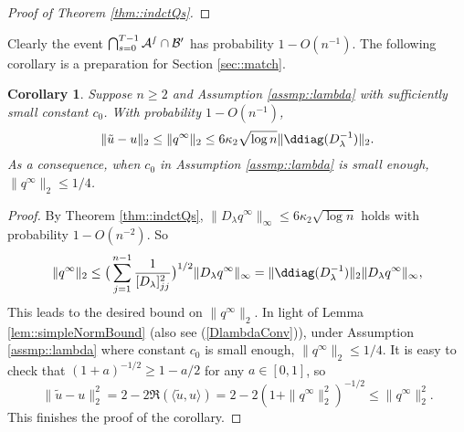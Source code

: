 \documentclass[12pt]{article}%
\theoremstyle{plain}%
\newtheorem{cor}{Corollary}[section]
\theoremstyle{remark}
\begin{document}
\begin{proof}[Proof of Theorem \ref{thm::indctQs}]

\end{proof}

Clearly the event $\bigcap_{s=0}^{T-1}\cal{A}^s \cap \cal{B}^0$ has probability $ 1 - O(n^{-1})$. The following corollary is a preparation for Section \ref{sec::match}.

\begin{cor}\label{cor::q2norm}
Suppose $n \ge 2$ and Assumption \ref{assmp::lambda} with sufficiently small constant $c_0$. With probability $1 - O(n^{-1})$, 
\begin{equation*}
\| \tilde{u} - u \|_2 \le \| q^\infty \|_2 \le 6\kappa_2\sqrt{\log n} \| \ddiag(D_\lambda^{-1}) \|_2.
\end{equation*}
As a consequence, when $c_0$ in Assumption \ref{assmp::lambda} is small enough, $\| q^\infty \|_2  \le 1/4$.
\end{cor}
\begin{proof}
By Theorem \ref{thm::indctQs}, $\| D_\lambda q^\infty \|_\infty \le 6 \kappa_2 \sqrt{\log n}$ holds with probability $1 - O(n^{-2})$. So
\begin{equation*}
\| q^\infty \|_2 \le \big( \sum_{j=1}^{n-1} \frac{ 1}{[D_\lambda]_{jj}^2} \big)^{1/2} \| D_\lambda q^\infty \|_\infty = \| \ddiag(D_\lambda^{-1}) \|_2 \| D_\lambda q^\infty \|_{\infty},
\end{equation*}
This leads to the desired bound on $\| q^\infty \|_2$. In light of Lemma \ref{lem::simpleNormBound} (also see (\ref{DlambdaConv})), under Assumption \ref{assmp::lambda} where constant $c_0$ is small enough, $\| q^\infty \|_2 \le 1/4$. It is easy to check that $(1 + a )^{-1/2} \ge 1 - a/2$ for any $a \in [0,1]$, so
\begin{equation*}
\| \tilde{u} - u \|_2^2 = 2 - 2\Re(\langle \tilde{u}, u \rangle) = 2 - 2(1 + \|q^\infty \|_2^2)^{-1/2} \le \| q^\infty \|_2^2.
\end{equation*}
This finishes the proof of the corollary.
\end{proof}
\end{document}
